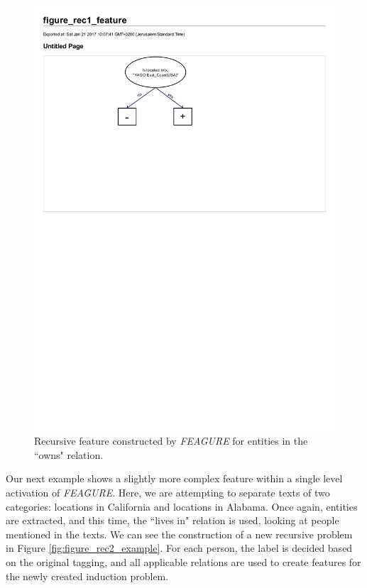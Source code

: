 \documentclass[twoside,11pt]{article}
\theoremstyle{definition}
\begin{document}
\begin{figure}[!h]
	\centering
	\includegraphics[width=0.5\linewidth]{figure_rec1_feature.pdf}
	\caption{Recursive feature constructed by \emph{FEAGURE} for entities in the ``owns" relation.}
	\label{fig:feature_eastcoast_rel}
\end{figure}

Our next example shows a slightly more complex feature within a single level activation of \emph{FEAGURE}. Here,  we are attempting to separate texts of two categories: locations in California and locations in Alabama. 
Once again, entities are extracted, and this time, the ``lives in" relation is used, looking at people mentioned in the texts.
We can see the construction of a new recursive problem in Figure \ref{fig:figure_rec2_example}. For each person, the label is decided based on the original tagging, and all applicable relations are used to create features for the newly created induction problem.
\end{document}
